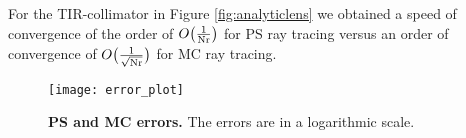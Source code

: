 For the TIR-collimator in Figure \ref{fig:analyticlens} we obtained a speed of convergence of the order of $O\big(\frac{1}{\textrm{Nr}}\big)$ for PS ray tracing versus an order of convergence of $O\big(\frac{1}{\sqrt{\textrm{Nr}}}\big)$ for MC ray tracing.
\begin{figure}[h!]
 \begin{center}
   \texttt{[image: error\_plot]}
    \end{center}
     \caption{\textbf{PS and MC errors.} The errors are in a logarithmic scale.}
 \label{fig:error2}
\end{figure}
